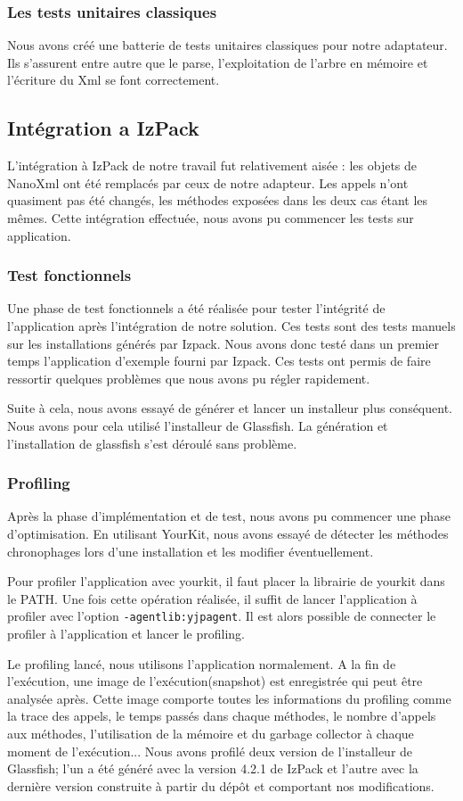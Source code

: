 \subsubsection{Les tests unitaires classiques}
Nous avons créé une batterie de tests unitaires classiques pour notre adaptateur.
Ils s'assurent entre autre que le parse, l'exploitation de l'arbre en mémoire et l'écriture du Xml se font correctement.
\subsection{Intégration a IzPack}
L'intégration à IzPack de notre travail fut relativement aisée : les objets de NanoXml ont été remplacés par ceux de notre adapteur.
Les appels n'ont quasiment pas été changés, les méthodes exposées dans les deux cas étant les mêmes.
Cette intégration effectuée, nous avons pu commencer les tests sur application.
\subsubsection{Test fonctionnels}
Une phase de test fonctionnels a été réalisée pour tester l'intégrité de l'application après l'intégration de notre solution.
Ces tests sont des tests manuels sur les installations générés par Izpack.
Nous avons donc testé dans un premier temps l'application d'exemple fourni par Izpack.
Ces tests ont permis de faire ressortir quelques problèmes que nous avons pu régler rapidement.

Suite à cela, nous avons essayé de générer et lancer un installeur plus conséquent.
Nous avons pour cela utilisé l'installeur de Glassfish.
La génération et l'installation de glassfish s'est déroulé sans problème.
\subsubsection{Profiling}
Après la phase d'implémentation et de test, nous avons pu commencer une phase d'optimisation.
En utilisant YourKit, nous avons essayé de détecter les méthodes chronophages lors d'une installation et les modifier éventuellement.

Pour profiler l'application avec yourkit, il faut placer la librairie de yourkit dans le PATH. 
Une fois cette opération réalisée, il suffit de lancer l'application à profiler avec l'option \verb|-agentlib:yjpagent|.
Il est alors possible de connecter le profiler à l'application et lancer le profiling.

Le profiling lancé, nous utilisons l'application normalement. 
A la fin de l'exécution, une image de l'exécution(snapshot) est enregistrée qui peut être analysée après.
Cette image comporte toutes les informations du profiling comme la trace des appels, le temps passés dans chaque méthodes, le nombre d'appels aux méthodes, l'utilisation de la mémoire et du garbage collector à chaque moment de l'exécution...
Nous avons profilé deux version de l'installeur de Glassfish; l'un a été généré avec la version 4.2.1 de IzPack et l'autre avec la dernière version construite à partir du dépôt et comportant nos modifications.

